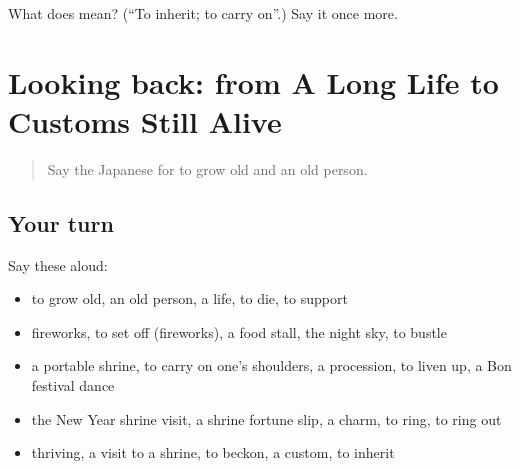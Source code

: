 \begin{tcolorbox}[breakable,colback=teal!4,colframe=teal!35!black,title={Before you move on}]
What does  mean? (\textquotedblleft{}To inherit; to carry on\textquotedblright{}.) Say it once more.
\end{tcolorbox}
\section[(dialogue)]{Looking back: from A Long Life to Customs Still Alive}

\label{lesson:JA-R296-review-292-296}



\begin{quote}
Say the Japanese for to grow old and an old person.
\end{quote}

\subsection*{Your turn}
Say these aloud:

\begin{itemize}
\raggedright
  \item to grow old, an old person, a life, to die, to support
  \item fireworks, to set off (fireworks), a food stall, the night sky, to bustle
  \item a portable shrine, to carry on one's shoulders, a procession, to liven up, a Bon festival dance
  \item the New Year shrine visit, a shrine fortune slip, a charm, to ring, to ring out
  \item thriving, a visit to a shrine, to beckon, a custom, to inherit
\end{itemize}

